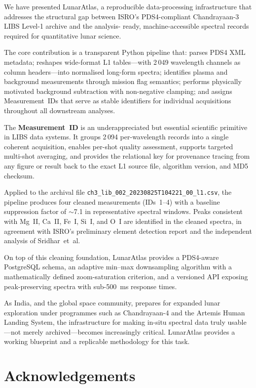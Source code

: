 \documentclass[a4paper,twocolumn,10pt]{article}
\begin{document}
We have presented LunarAtlas, a reproducible data-processing
infrastructure that addresses the structural gap between ISRO's
PDS4-compliant Chandrayaan-3 LIBS Level-1 archive and the analysis-
ready, machine-accessible spectral records required for quantitative
lunar science.

The core contribution is a transparent Python pipeline that: parses
PDS4 XML metadata; reshapes wide-format L1 tables---with 2\,049
wavelength channels as column headers---into normalised long-form
spectra; identifies plasma and background measurements through mission
flag semantics; performs physically motivated background subtraction
with non-negative clamping; and assigns Measurement~IDs that serve as
stable identifiers for individual acquisitions throughout all
downstream analyses.

The \textbf{Measurement~ID} is an underappreciated but essential
scientific primitive in LIBS data systems.  It groups 2\,094
per-wavelength records into a single coherent acquisition, enables
per-shot quality assessment, supports targeted multi-shot averaging,
and provides the relational key for provenance tracing from any figure
or result back to the exact L1 source file, algorithm version, and
MD5 checksum.

Applied to the archival file
\texttt{ch3\_lib\_002\_20230825T104221\_00\_l1.csv}, the pipeline
produces four cleaned measurements (IDs~1--4) with a baseline
suppression factor of $\sim$7.1 in representative spectral windows.
Peaks consistent with Mg~II, Ca~II, Fe~I, Si~I, and O~I are
identified in the cleaned spectra, in agreement with ISRO's
preliminary element detection report and the independent analysis of
Sridhar~et~al.

On top of this cleaning foundation, LunarAtlas provides a PDS4-aware
PostgreSQL schema, an adaptive min--max downsampling algorithm with
a mathematically defined zoom-saturation criterion, and a versioned
API exposing peak-preserving spectra with sub-\SI{500}{\milli\second}
response times.

As India, and the global space community, prepares for expanded lunar
exploration under programmes such as Chandrayaan-4 and the Artemis
Human Landing System, the infrastructure for making in-situ spectral
data truly usable---not merely archived---becomes increasingly
critical.  LunarAtlas provides a working blueprint and a replicable
methodology for this task.


\section*{Acknowledgements}
\end{document}
